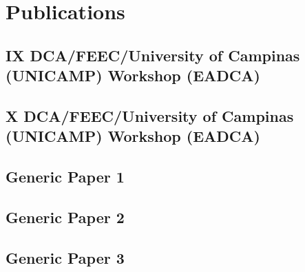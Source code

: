 \chapter{Publications}
\label{ap:publications}


\section{IX DCA/FEEC/University of Campinas (UNICAMP) Workshop (EADCA)}



\section{X DCA/FEEC/University of Campinas (UNICAMP) Workshop (EADCA)}



\section{Generic Paper 1}


\section{Generic Paper 2}


\section{Generic Paper 3}



